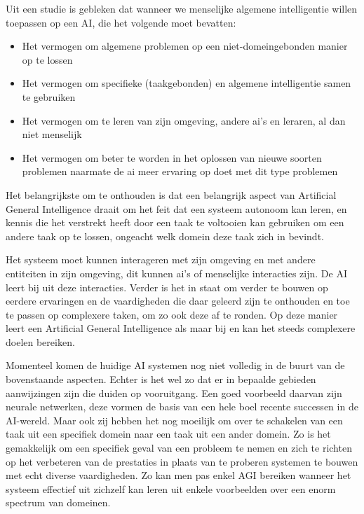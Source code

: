 Uit een studie is gebleken dat wanneer we menselijke algemene intelligentie willen toepassen op een AI, die het volgende moet bevatten: \linebreak

\begin{itemize}
    \item Het vermogen om algemene problemen op een niet-domeingebonden manier op te lossen
    \item Het vermogen om specifieke (taakgebonden) en algemene intelligentie samen te gebruiken
    \item Het vermogen om te leren van zijn omgeving, andere ai's en leraren, al dan niet menselijk
    \item Het vermogen om beter te worden in het oplossen van nieuwe soorten problemen naarmate de ai meer ervaring op doet met dit type problemen
\end{itemize}

Het belangrijkste om te onthouden is dat een belangrijk aspect van Artificial General Intelligence draait om het feit dat een systeem autonoom kan leren, en kennis die het verstrekt heeft door een taak te voltooien kan gebruiken om een andere taak op te lossen, ongeacht welk domein deze taak zich in bevindt. 

Het systeem moet kunnen interageren met zijn omgeving en met andere entiteiten in zijn omgeving, dit kunnen ai's of menselijke interacties zijn. De AI leert bij uit deze interacties. Verder is het in staat om verder te bouwen op eerdere ervaringen en de vaardigheden die daar geleerd zijn te onthouden en toe te passen op complexere taken, om zo ook deze af te ronden. Op deze manier leert een Artificial General Intelligence als maar bij en kan het steeds complexere doelen bereiken.

\autocite{goertzel2007artificial}

Momenteel komen de huidige AI systemen nog niet volledig in de buurt van de bovenstaande aspecten. Echter is het wel zo dat er in bepaalde gebieden aanwijzingen zijn die duiden op vooruitgang. Een goed voorbeeld daarvan zijn neurale netwerken, deze vormen de basis van een hele boel recente successen in de AI-wereld. Maar ook zij hebben het nog moeilijk om over te schakelen van een taak uit een specifiek domein naar een taak uit een ander domein. Zo is het gemakkelijk om een specifiek geval van een probleem te nemen en zich te richten op het verbeteren van de prestaties in plaats van te proberen systemen te bouwen met echt diverse vaardigheden. Zo kan men pas enkel AGI bereiken wanneer het systeem effectief uit zichzelf kan leren uit enkele voorbeelden over een enorm spectrum van domeinen.


